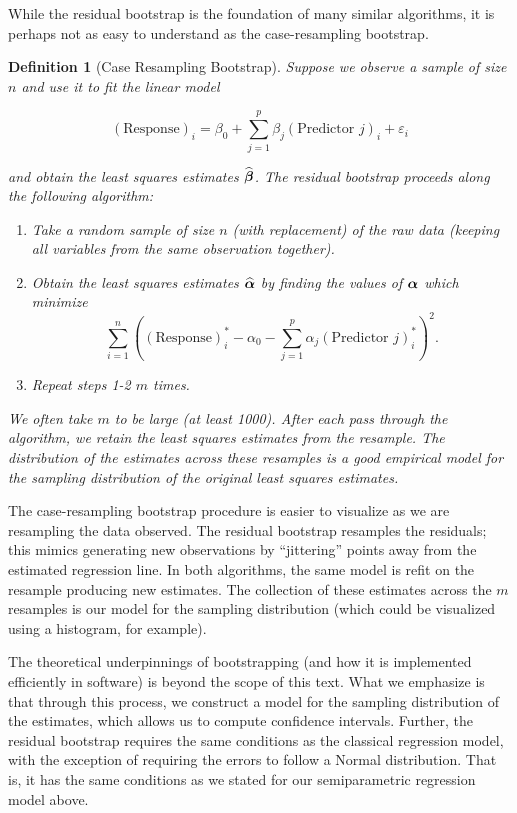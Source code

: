 \documentclass[
]{book}
\providecommand{\tightlist}{%
  \setlength{\itemsep}{0pt}\setlength{\parskip}{0pt}}
\theoremstyle{plain}
\theoremstyle{mydefn}
\newtheorem{definition}{Definition}[chapter]
\theoremstyle{myexmpl}
\theoremstyle{remark}
\begin{document}
While the residual bootstrap is the foundation of many similar algorithms, it is perhaps not as easy to understand as the case-resampling bootstrap.

\begin{definition}[Case Resampling Bootstrap]
\protect\hypertarget{def:defn-case-resampling-bootstrap}{}{\label{def:defn-case-resampling-bootstrap} {} }Suppose we observe a sample of size \(n\) and use it to fit the linear model

\[(\text{Response})_i = \beta_0 + \sum_{j=1}^{p} \beta_j (\text{Predictor } j)_i + \varepsilon_i\]

and obtain the least squares estimates \(\widehat{\boldsymbol{\beta}}\). The residual bootstrap proceeds along the following algorithm:

\begin{enumerate}
\def\labelenumi{\arabic{enumi}.}
\tightlist
\item
  Take a random sample of size \(n\) (with replacement) of the raw data (keeping all variables from the same observation together).
\item
  Obtain the least squares estimates \(\widehat{\boldsymbol{\alpha}}\) by finding the values of \(\boldsymbol{\alpha}\) which minimize
  \[\sum_{i=1}^{n} \left((\text{Response})_i^* - \alpha_0 - \sum_{j=1}^{p} \alpha_j (\text{Predictor } j)_i^*\right)^2.\]
\item
  Repeat steps 1-2 \(m\) times.
\end{enumerate}

We often take \(m\) to be large (at least 1000). After each pass through the algorithm, we retain the least squares estimates from the resample. The distribution of the estimates across these resamples is a good empirical model for the sampling distribution of the original least squares estimates.
\end{definition}

The case-resampling bootstrap procedure is easier to visualize as we are resampling the data observed. The residual bootstrap resamples the residuals; this mimics generating new observations by ``jittering'' points away from the estimated regression line. In both algorithms, the same model is refit on the resample producing new estimates. The collection of these estimates across the \(m\) resamples is our model for the sampling distribution (which could be visualized using a histogram, for example).

The theoretical underpinnings of bootstrapping (and how it is implemented efficiently in software) is beyond the scope of this text. What we emphasize is that through this process, we construct a model for the sampling distribution of the estimates, which allows us to compute confidence intervals. Further, the residual bootstrap requires the same conditions as the classical regression model, with the exception of requiring the errors to follow a Normal distribution. That is, it has the same conditions as we stated for our semiparametric regression model above.
\end{document}
